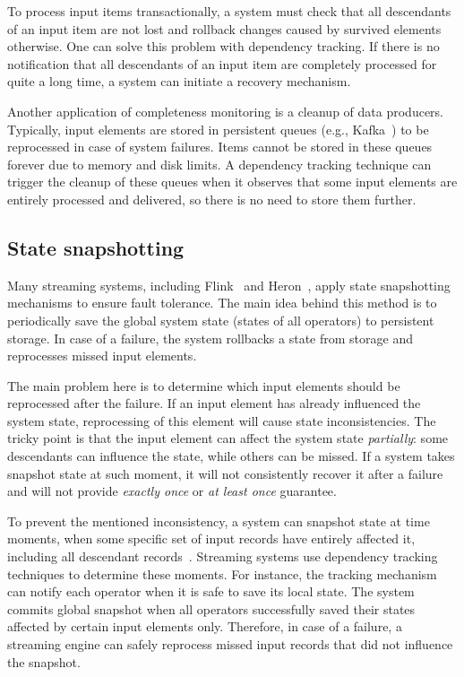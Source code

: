 To process input items transactionally, a system must check that all descendants of an input item are not lost and rollback changes caused by survived elements otherwise. One can solve this problem with dependency tracking. If there is no notification that all descendants of an input item are completely processed for quite a long time, a system can initiate a recovery mechanism.

Another application of completeness monitoring is a cleanup of data producers. Typically, input elements are stored in persistent queues (e.g., Kafka~\cite{kreps2011kafka}) to be reprocessed in case of system failures. Items cannot be stored in these queues forever due to memory and disk limits. A dependency tracking technique can trigger the cleanup of these queues when it observes that some input elements are entirely processed and delivered, so there is no need to store them further.

\subsection{State snapshotting}
Many streaming systems, including Flink~\cite{Carbone:2017:SMA:3137765.3137777} and Heron~\cite{Kulkarni:2015:THS:2723372.2742788}, apply state snapshotting mechanisms to ensure fault tolerance. The main idea behind this method is to periodically save the global system state (states of all operators) to persistent storage. In case of a failure, the system rollbacks a state from storage and reprocesses missed input elements. 

The main problem here is to determine which input elements should be reprocessed after the failure. If an input element has already influenced the system state, reprocessing of this element will cause state inconsistencies. The tricky point is that the input element can affect the system state {\em partially}: some descendants can influence the state, while others can be missed. If a system takes snapshot state at such moment, it will not consistently recover it after a failure~\cite{2015arXiv150608603C} and will not provide {\em exactly once} or {\em at least once} guarantee.

To prevent the mentioned inconsistency, a system can snapshot state at time moments, when some specific set of input records have entirely affected it, including all descendant records~\cite{2015arXiv150608603C, thepaper}. Streaming systems use dependency tracking techniques to determine these moments. For instance, the tracking mechanism can notify each operator when it is safe to save its local state. The system commits global snapshot when all operators successfully saved their states affected by certain input elements only. Therefore, in case of a failure, a streaming engine can safely reprocess missed input records that did not influence the snapshot.

